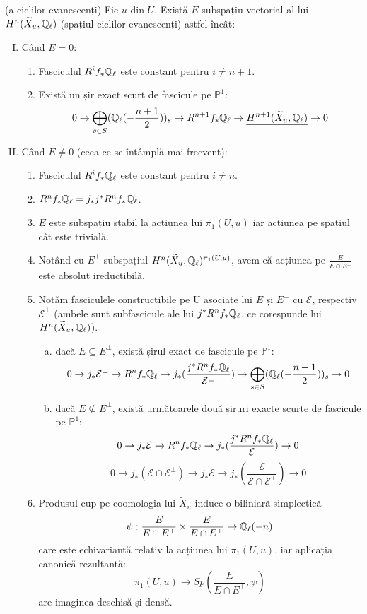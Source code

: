 \documentclass[13pt,openany]{book}
\begin{document}
\begin{teo}
(a ciclilor evanescenți) Fie $u$ din $U$. Există $E$ subspațiu vectorial al lui $H^n(\widetilde{X}_u,\mathbb{Q}_\ell)$ (spațiul ciclilor evanescenți) astfel încât:
\begin{enumerate}[I.]
\item Când $E=0$:
\begin{enumerate}[1.]
\item Fasciculul $R^i f_* \mathbb{Q}_\ell$ este constant pentru $i\neq n+1$.
\item Există un șir exact scurt de fascicule pe $\mathbb{P}^1$:
$$0 \rightarrow \bigoplus\limits_{s\in S} (\mathbb{Q}_\ell(-\frac{n+1}{2}))_s \rightarrow R^{n+1}f_*\mathbb{Q}_\ell \rightarrow \underline{H^{n+1}(\widetilde{X}_u,\mathbb{Q}_\ell)} \rightarrow 0$$
\end{enumerate}

\item Când $E\neq 0$ (ceea ce se întâmplă mai frecvent):
\begin{enumerate}[1.]
\item Fasciculul $R^i f_* \mathbb{Q}_\ell$ este constant pentru $i\neq n$.
\item $R^n f_* \mathbb{Q}_\ell = j_* j^* R^n f_* \mathbb{Q}_\ell$.
\item $E$ este subspațiu stabil la acțiunea lui $\pi_1(U,u)$ iar acțiunea pe spațiul cât este trivială.
\item Notând cu $E^\perp$ subspațiul $H^n(\widetilde{X}_u,\mathbb{Q}_\ell)^{\pi_1(U,u)}$, avem că acțiunea pe $\frac{E}{E \cap E^\perp}$ este absolut ireductibilă.
\item Notăm fasciculele constructibile pe U asociate lui $E$ și $E^\perp$ cu $\mathcal{E}$, respectiv $\mathcal{E}^\perp$ (ambele sunt subfascicule ale lui $j^* R^n f_* \mathbb{Q}_\ell$, ce corespunde lui $H^n(\widetilde{X}_u,\mathbb{Q}_\ell)$).
\begin{enumerate}[a)]
\item dacă $E \subseteq E^\perp$, există șirul exact de fascicule pe $\mathbb{P}^1$:
$$0 \rightarrow j_* \mathcal{E}^\perp \rightarrow R^n f_* \mathbb{Q}_\ell \rightarrow j_*(\frac{j^* R^n f_* \mathbb{Q}_\ell}{\mathcal{E}^\perp}) \rightarrow \bigoplus\limits_{s\in S} (\mathbb{Q}_\ell(-\frac{n+1}{2}))_s \rightarrow 0$$
\item dacă $E \nsubseteq E^\perp$, există următoarele două șiruri exacte scurte de fascicule pe $\mathbb{P}^1$:
$$0\rightarrow j_*\mathcal{E} \rightarrow R^n f_* \mathbb{Q}_\ell \rightarrow j_*(\frac{j^* R^n f_* \mathbb{Q}_\ell}{\mathcal{E}}) \rightarrow 0$$
$$0 \rightarrow j_*(\mathcal{E} \cap \mathcal{E}^\perp)  \rightarrow j_*\mathcal{E}  \rightarrow j_*(\frac{\mathcal{E}}{\mathcal{E} \cap \mathcal{E}^\perp})  \rightarrow 0$$
\end{enumerate}
\item Produsul cup pe coomologia lui $\widetilde{X}_u$ induce o biliniară simplectică
$$\psi : \frac{E}{E \cap E^\perp} \times \frac{E}{E \cap E^\perp} \rightarrow \mathbb{Q}_\ell(-n)$$
care este echivariantă relativ la acțiunea lui $\pi_1(U,u)$, iar aplicația canonică rezultantă:
$$\pi_1(U,u) \rightarrow Sp(\frac{E}{E \cap E^\perp},\psi)$$
are imaginea deschisă și densă.
\end{enumerate}
\end{enumerate}
\end{teo}
\end{document}
